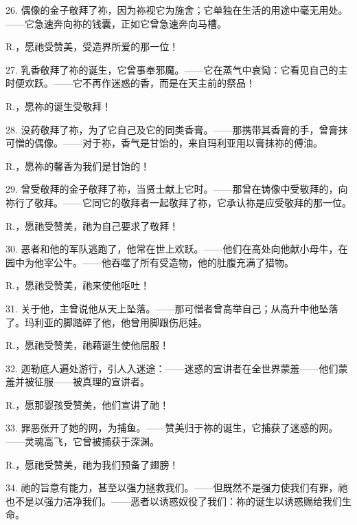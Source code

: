 26. 偶像的金子敬拜了祢，因为祢视它为施舍；它单独在生活的用途中毫无用处。——它急速奔向祢的钱囊，正如它曾急速奔向马槽。\par

R.，愿祂受赞美，受造界所爱的那一位！\par

27. 乳香敬拜了祢的诞生，它曾事奉邪魔。——它在蒸气中哀恸：它看见自己的主时便欢跃。——它不再作迷惑的香，而是在天主前的祭品！\par

R.，愿祢的诞生受敬拜！\par

28. 没药敬拜了祢，为了它自己及它的同类香膏。——那携带其香膏的手，曾膏抹可憎的偶像。——对于祢，香气是甘饴的，来自玛利亚用以膏抹祢的傅油。\par

R.，愿祢的馨香为我们是甘饴的！\par

29. 曾受敬拜的金子敬拜了祢，当贤士献上它时。——那曾在铸像中受敬拜的，向祢行了敬拜。——它同它的敬拜者一起敬拜了祢，它承认祢是应受敬拜的那一位。\par

R.，愿祂受赞美，祂为自己要求了敬拜！\par

30. 恶者和他的军队逃跑了，他常在世上欢跃。——他们在高处向他献小母牛，在园中为他宰公牛。——他吞噬了所有受造物，他的肚腹充满了猎物。\par

R.，愿祂受赞美，祂来使他呕吐！\par

31. 关于他，主曾说他从天上坠落。——那可憎者曾高举自己；从高升中他坠落了。玛利亚的脚踏碎了他，他曾用脚跟伤厄娃。\par

R.，愿祂受赞美，祂藉诞生使他屈服！\par

32. 迦勒底人遍处游行，引人入迷途：——迷惑的宣讲者在全世界蒙羞——他们蒙羞并被征服——被真理的宣讲者。\par

R.，愿那婴孩受赞美，他们宣讲了祂！\par

33. 罪恶张开了她的网，为捕鱼。——赞美归于祢的诞生，它捕获了迷惑的网。——灵魂高飞，它曾被捕获于深渊。\par

R.，愿祂受赞美，祂为我们预备了翅膀！\par

34. 祂的旨意有能力，甚至以强力拯救我们。——但既然不是强力使我们有罪，祂也不是以强力洁净我们。——恶者以诱惑奴役了我们：祢的诞生以诱惑赐给我们生命。\par

